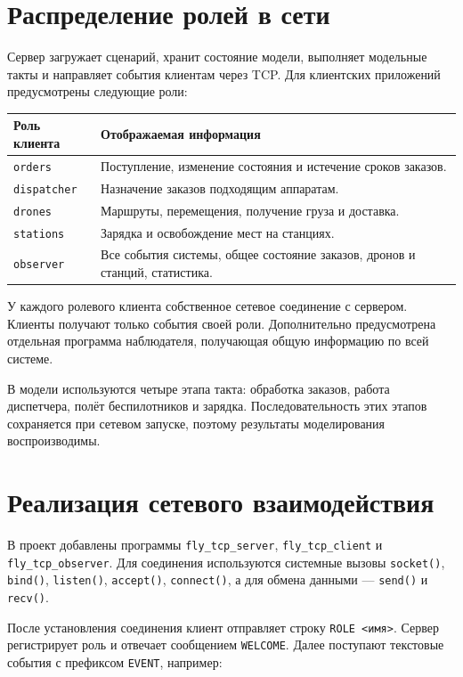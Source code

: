 \documentclass[12pt,a4paper]{article}
\begin{document}
\section{Распределение ролей в сети}

Сервер загружает сценарий, хранит состояние модели, выполняет модельные такты и направляет события клиентам через TCP. Для клиентских приложений предусмотрены следующие роли:

\begin{center}
\begin{tabularx}{\textwidth}{@{}p{40mm}X@{}}
\toprule
\textbf{Роль клиента} & \textbf{Отображаемая информация} \\
\midrule
\texttt{orders} & Поступление, изменение состояния и истечение сроков заказов.\\
\texttt{dispatcher} & Назначение заказов подходящим аппаратам.\\
\texttt{drones} & Маршруты, перемещения, получение груза и доставка.\\
\texttt{stations} & Зарядка и освобождение мест на станциях.\\
\texttt{observer} & Все события системы, общее состояние заказов, дронов и станций, статистика.\\
\bottomrule
\end{tabularx}
\end{center}

У каждого ролевого клиента собственное сетевое соединение с сервером. Клиенты получают только события своей роли. Дополнительно предусмотрена отдельная программа наблюдателя, получающая общую информацию по всей системе.

В модели используются четыре этапа такта: обработка заказов, работа диспетчера, полёт беспилотников и зарядка. Последовательность этих этапов сохраняется при сетевом запуске, поэтому результаты моделирования воспроизводимы.

\section{Реализация сетевого взаимодействия}

В проект добавлены программы \texttt{fly\_tcp\_server}, \texttt{fly\_tcp\_client} и \texttt{fly\_tcp\_observer}. Для соединения используются системные вызовы \texttt{socket()}, \texttt{bind()}, \texttt{listen()}, \texttt{accept()}, \texttt{connect()}, а для обмена данными --- \texttt{send()} и \texttt{recv()}.

После установления соединения клиент отправляет строку \texttt{ROLE <имя>}. Сервер регистрирует роль и отвечает сообщением \texttt{WELCOME}. Далее поступают текстовые события с префиксом \texttt{EVENT}, например:
\end{document}
